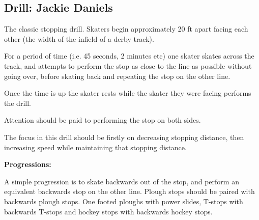 \subsection*{Drill: Jackie Daniels} 
\label{drill:stopping/jackie_daniels}


The classic stopping drill.
Skaters begin approximately 20 ft apart facing each other (the width of the infield of a derby track).

For a period of time (i.e. 45 seconds, 2 minutes etc) one skater skates across the track, and attempts to perform the stop as close to the line as possible without going over, before skating back and repeating the stop on the other line.   

Once the time is up the skater rests while the skater they were facing performs the drill. 

Attention should be paid to performing the stop on both sides.  


The focus in this drill should be firstly on decreasing stopping distance, then increasing speed while maintaining that stopping distance.

{\bf Progressions:}

A simple progression is to skate backwards out of the stop, and perform an equivalent backwards stop on the other line.
Plough stops should be paired with backwards plough stops. One footed ploughs with power slides, T-stops with backwards T-stops and hockey stops with backwards hockey stops.



